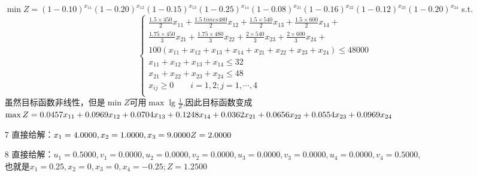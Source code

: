\documentclass[a4paper,20pt]{article}
\begin{document}
\begin{itemize}
        $\min Z =(1-0.10)^{x_{11}}(1-0.20)^{x_{12}}(1-0.15)^{x_{13}}(1-0.25)^{x_{14}}
        (1-0.08)^{x_{21}}
        (1-0.16)^{x_{22}}(1-0.12)^{x_{23}}(1-0.20)^{x_{24}}$
            s.t.$$\left\{\begin{matrix}
                    \frac{1.5 \times 450}{2}x_{11}+\frac{1.5 \ times 480}{2}x_{12}+\frac{1.5 \times 540}{2}x_{13}+\frac{1.5 \times 600}{2}x_{14}+ \\\frac{1.75 \times 450}{3}x_{21}+\frac{1.75 \times 480}{3}x_{22}+\frac{2 \times 540}{3}x_{23}+\frac{2 \times 600}{3}x_{24}+\\100(x_{11}+x_{12}+x_{13}+x_{14}+x_{21}+x_{22}+x_{23}+x_{24})\leq 48000\\
                    x_{11}+x_{12}+x_{13}+x_{14} \leq 32                                                                                           \\
                    x_{21}+x_{22}+x_{23}+x_{24} \leq 48                                                                                           \\
                    x_{ij}\geq 0 \qquad i=1,2;j=1,\cdots,4                                                                                        \\
                \end{matrix}\right.$$
            虽然目标函数非线性，但是$\min Z$可用$\max \lg{\frac{1}{Z}}$,因此目标函数变成
            \\$\max Z =0.0457x_{11}+0.0969x_{12}+0.0704x_{13}+0.1248x_{14}+0.0362x_{21}+\\0.0656x_{22}+0.0554x_{23}+0.0969x_{24}$
                \item[7]直接给解：$x_1 =
            4.0000
            ,x_2=1.0000
            ,x_3=9.0000
            \\Z=2.0000$
                \item[8]直接给解：$u_1=
            0.5000,
            v_1=0.0000,
            u_2=0.0000,
            v_2=0.0000,
            u_3=0.0000,
            v_3=0.0000,
            u_4=0.0000,
            v_4=0.5000,$
                \\也就是$
            x_1=0.25,x_2=0,x_3=0,x_4=-0.25;
            Z =1.2500$


\end{itemize}
\end{document}
